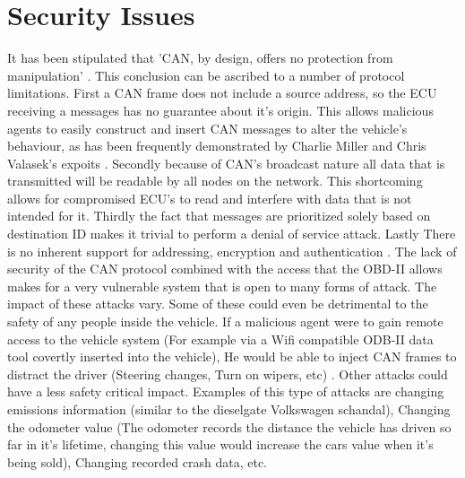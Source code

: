\documentclass[11pt]{article}
\begin{document}
\section{Security Issues}
It has been stipulated that 'CAN, by design, offers no protection from manipulation' \cite{Klinedinst05}. This conclusion can be ascribed to a number of protocol limitations. First a CAN frame does not include a source address, so the ECU receiving a messages has no guarantee about it's origin. This allows malicious agents to easily construct and insert CAN messages to alter the vehicle's behaviour, as has been frequently demonstrated by Charlie Miller and Chris Valasek's expoits \cite{MillerA}\cite{MillerB}\cite{MillerC}. Secondly because of CAN's broadcast nature all data that is transmitted will be readable by all nodes on the network. This shortcoming allows for compromised ECU's to read and interfere with data that is not intended for it. Thirdly the fact that messages are prioritized solely based on destination ID makes it trivial to perform a denial of service attack. Lastly There is no inherent support for addressing, encryption and authentication \cite{MillerB}.
\newline
\newline
The lack of security of the CAN protocol combined with the access that the OBD-II allows makes for a very vulnerable system that is open to many forms of attack. The impact of these attacks vary. Some of these could even be detrimental to the safety of any people inside the vehicle. If a malicious agent were to gain remote access to the vehicle system (For example via a Wifi compatible ODB-II data tool covertly inserted into the vehicle), He would be able to inject CAN frames to distract the driver (Steering changes, Turn on wipers, etc) \cite{Washington}. Other attacks could have a less safety critical impact. Examples of this type of attacks are changing emissions information (similar to the dieselgate Volkswagen schandal), Changing the odometer value (The odometer records the distance the vehicle has driven so far in it's lifetime, changing this value would increase the cars value when it's being sold), Changing recorded crash data, etc. \cite{Bayer15}
\end{document}
